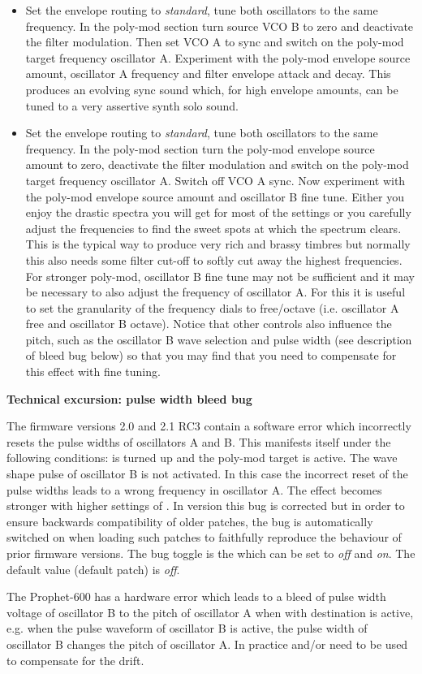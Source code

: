 \begin{itemize}
  \item Set the envelope routing to \textit{standard}, tune both oscillators to the same frequency. In the poly-mod section turn source VCO B to zero and deactivate the filter modulation. Then set VCO A to sync and switch on the poly-mod target frequency oscillator A. Experiment with the poly-mod envelope source amount, oscillator A frequency and filter envelope attack and decay. This produces an evolving sync sound which, for high envelope amounts, can be tuned to a very assertive synth solo sound.
  \item Set the envelope routing to \textit{standard}, tune both oscillators to the same frequency. In the poly-mod section turn the poly-mod envelope source amount to zero, deactivate the filter modulation  and switch on the poly-mod target frequency oscillator A. Switch off VCO A sync. Now experiment with the poly-mod envelope source amount and oscillator B fine tune. Either you enjoy the drastic spectra you will get for most of the settings or you carefully adjust the frequencies to find the sweet spots at which the spectrum clears. This is the typical way to produce very rich and brassy timbres but normally this also needs some filter cut-off to softly cut away the highest frequencies. For stronger poly-mod, oscillator B fine tune may not be sufficient and it may be necessary to also adjust the frequency of oscillator A. For this it is useful to set the granularity of the frequency dials to free/octave (i.e. oscillator A free and oscillator B octave). Notice that other controls also influence the pitch, such as the oscillator B wave selection and pulse width (see description of bleed bug below) so that you may find that you need to compensate for this effect with fine tuning.   
\end{itemize} 

\textbf{Technical excursion: pulse width bleed bug}

The firmware versions 2.0 and 2.1 RC3 contain a software error which incorrectly resets the pulse widths of oscillators A and B. This manifests itself under the following conditions: \polymodosc is turned up and the poly-mod target \polymodfreq is active. The wave shape pulse of oscillator B is not activated. In this case the incorrect reset of the pulse widths leads to a wrong frequency in oscillator A. The effect becomes stronger with higher settings of \polymodosc. In version \version this bug is corrected but in order to ensure backwards compatibility of older patches, the bug is automatically switched on when loading such patches to faithfully reproduce the behaviour of prior firmware versions.  The bug toggle is the \syncbug which can be set to \textit{off} and \textit{on}. The default value (default patch) is \textit{off}.

The Prophet-600 has a hardware error which leads to a bleed of pulse width voltage of oscillator B to the pitch of oscillator A when \polymodosc with destination \polymodfreq is active, e.g. when the pulse waveform of oscillator B is active, the pulse width of oscillator B changes the pitch of oscillator A. In practice \oscfreq and/or \freqfine need to be used to compensate for the drift.   
